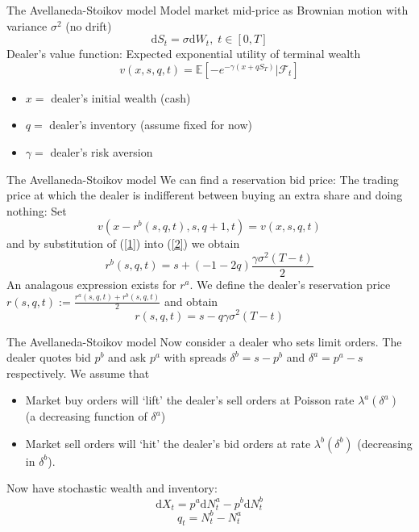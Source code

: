 \documentclass{beamer} %
\begin{document}
\begin{frame}{The Avellaneda-Stoikov model}
    Model market mid-price as Brownian motion with variance $\sigma^2$ (no drift)
    $$\mathrm d S_t=\sigma \mathrm d W_t,\;t\in[0,T]$$
    Dealer's value function: Expected exponential utility of terminal wealth
    \begin{equation}\label{1}
        v(x,s,q,t)=\mathbb{E}\left[-e^{-\gamma(x+qS_T)}|\mathcal{F}_t\right]
    \end{equation}
    \begin{itemize}
        \item $x=$ dealer's initial wealth (cash)
        \item $q=$ dealer's inventory (assume fixed for now)
        \item $\gamma=$ dealer's risk aversion
    \end{itemize}
\end{frame}

\begin{frame}{The Avellaneda-Stoikov model}
    We can find a reservation bid price: The trading price at which the dealer is indifferent between buying an extra share and doing nothing: Set
    \begin{equation}\label{2}
        v(x-r^b(s,q,t),s,q+1,t)=v(x,s,q,t)
    \end{equation}
    and by substitution of (\ref{1}) into (\ref{2}) we obtain
    \begin{equation}\label{3}
        r^b(s,q,t)=s+(-1-2q)\frac{\gamma\sigma^2(T-t)}{2}
    \end{equation}
    An analagous expression exists for $r^a.$ We define the dealer's reservation price $r(s,q,t):=\frac{r^a(s,q,t)+r^b(s,q,t)}{2}$ and obtain
    \begin{equation}\label{4}
        r(s,q,t)=s-q\gamma\sigma^2(T-t)
    \end{equation}
\end{frame}

\begin{frame}{The Avellaneda-Stoikov model}
    Now consider a dealer who sets limit orders. 
    The dealer quotes bid $p^b$ and ask $p^a$ with spreads $\delta^b=s-p^b$ and $\delta^a=p^a-s$
    respectively.
    We assume that 
    \begin{itemize}
        \item Market buy orders will `lift' the dealer's sell orders at Poisson rate $\lambda^a(\delta^a)$ (a decreasing function of $\delta^a$)
        \item Market sell orders will `hit' the dealer's bid orders at rate $\lambda^b(\delta^b)$ (decreasing in $\delta^b$).
    \end{itemize}
    Now have stochastic wealth and inventory:
    \begin{equation}
        \mathrm dX_t=p^a\mathrm dN_t^a-p^b\mathrm dN_t^b
    \end{equation}
    \begin{equation}
        q_t=N_t^b-N_t^a
    \end{equation}
\end{frame}
\end{document}
